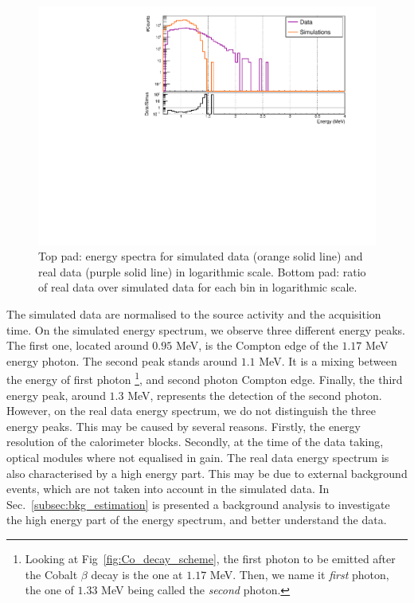 \begin{figure}[h]
  \centering
  \includegraphics[width=17cm]{commissioning/fig_commissioning/Co_efficiency_detector.pdf}
  \caption{Top pad: energy spectra for simulated data (orange solid line) and real data (purple solid line) in logarithmic scale.
    Bottom pad: ratio of real data over simulated data for each bin in logarithmic scale.
\label{fig:detector_efficiency}}
\end{figure}
The simulated data are normalised to the source activity and the acquisition time.
On the simulated energy spectrum, we observe three different energy peaks.
The first one, located around $0.95$ MeV, is the Compton edge of the $1.17$ MeV energy photon.
The second peak stands around $1.1$ MeV. It is a mixing between the energy of first photon
\footnote{Looking at Fig~\ref{fig:Co_decay_scheme}, the first photon to be emitted after the Cobalt $\beta$ decay is the one at $1.17$ MeV.
  Then, we name it \emph{first} photon, the one of $1.33$ MeV being called the \emph{second} photon.}, and second photon Compton edge.
Finally, the third energy peak, around $1.3$ MeV, represents the detection of the second photon.
However, on the real data energy spectrum, we do not distinguish the three energy peaks.
This may be caused by several reasons.
Firstly, the energy resolution of the calorimeter blocks.
Secondly, at the time of the data taking, optical modules where not equalised in gain.
The real data energy spectrum is also characterised by a high energy part.
This may be due to external background events, which are not taken into account in the simulated data.
In Sec.~\ref{subsec:bkg_estimation} is presented a background analysis to investigate the high energy part of the energy spectrum, and better understand the data.


